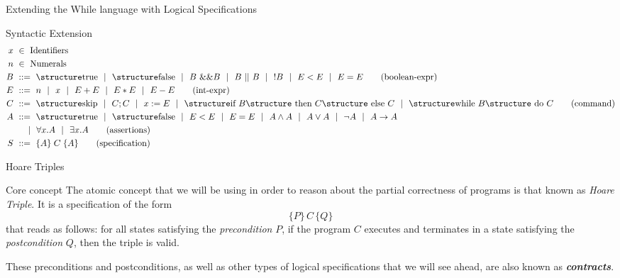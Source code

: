 \documentclass[aspectratio=169]{beamer}
\begin{document}
\begin{slide}{Extending the While language with Logical Specifications}
\begin{block}{Syntactic Extension}
  \begin{align*}
  x &~\in~ \text{Identifiers}
  \\
  n &~\in~ \text{Numerals}
  \\
  B &~::=~ \kw{true} ~~|~~ \kw{false}  ~~|~~ B~ \&\& B ~~|~~ B ~||~ B ~~|~~ ! B ~~|~~ E<E ~~|~~ E=E
  \tag{boolean-expr}\\
  E &~::=~ n ~~|~~ x ~~|~~ E+E ~~|~~ E*E ~~|~~ E-E
  \tag{int-expr}\\
  C &~::=~ \kw {skip} ~~|~~ C;C ~~|~~ x:=E
 ~~|~~  \kw{if } B \kw{ then } C\kw{ else }C ~~|~~  \kw{while }B\kw{ do }C
  \tag{command}\\
  A &~::=~ \kw{true} ~~|~~ \kw{false}  ~~|~~ E<E ~~|~~ E=E ~~|~~ A \land A ~~|~~ A \lor A ~~|~~ \lnot A ~~|~~ A \to A\\
  &~~~~~|~~  \forall x. A ~~|~~\exists x.A \tag{assertions}\\
  S & ~::=~ \{A\}\;C\;\{A\}\tag{specification}
\end{align*}
\end{block}
\end{slide}

\begin{slide}{Hoare Triples}
  
  \begin{block}{Core concept}
    The atomic concept that we will be using in order to reason about the partial correctness of programs is that known as {\em Hoare Triple}. It is a specification of the form $$\{P\}\,C\,\{Q\}$$ that reads as follows: for all states satisfying the {\em \alert{precondition}} $P$, if the program $C$ executes and terminates in a state satisfying the {\em \alert{postcondition}} $Q$, then the triple is valid.
  \end{block}
  \alert{These preconditions and postconditions, as well as other types of logical specifications that we will see ahead, are also known as {\em {\bf contracts}}.}
\end{slide}
\end{document}
